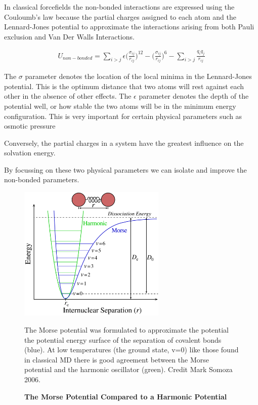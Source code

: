 In classical forcefields the non-bonded interactions are expressed using the Couloumb's law because the partial charges assigned to each atom and the Lennard-Jones potential to approximate the interactions arising from both Pauli exclusion and Van Der Walls Interactions.


\begin{equation}\label{nonbonded_eqs}
	\begin{aligned}
		U_{non-bonded} = \sum_{i>j} \epsilon \Big(\frac{\sigma_{ij}}{r_{ij}}\Big)^{12} - \Big(\frac{\sigma_{ij}}{r_{ij}}\Big)^{6} - \sum_{i>j} \frac{q_i q_j } {r_{ij}}
	\end{aligned}
\end{equation}


The $\sigma$ parameter denotes the location of the local minima in the Lennard-Jones potential. This is the optimum distance that two atoms will rest against each other in the absence of other effects. The $\epsilon$ parameter denotes the depth of the potential well, or how stable the two atoms will be in the minimum energy configuration. This is very important for certain physical parameters such as osmotic pressure  \cite{Yoo2018}

Conversely, the partial charges in a system have the greatest influence on the solvation energy.

By focussing on these two physical parameters we can isolate and improve the non-bonded parameters.

\begin{figure}
	\begin{center}
	\includegraphics[width=7cm]{figures/Morse-Potential.png}
	\end{center}
	\captionsetup{singlelinecheck = false, justification=raggedright}
	\caption[The Morse Potential Compared to a Harmonic Potential] {\textbf{The Morse Potential Compared to a Harmonic Potential}}{
		The Morse potential was formulated to approximate the potential the potential energy surface of the separation of covalent bonds (blue). At low temperatures (the ground state, v=0) like those found in classical MD there is good agreement between the Morse potential and the harmonic oscillator (green). Credit Mark Somoza 2006. 
}
	\label{morse_potential}
\end{figure}

